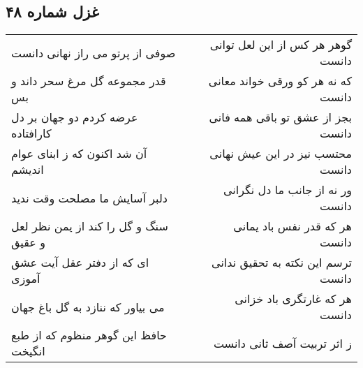 \begin{center}
\section*{غزل شماره ۴۸}
\label{sec:sh048}
\begin{longtable}{l p{0.5cm} r}
صوفی از پرتو می راز نهانی دانست
&&
گوهر هر کس از این لعل توانی دانست
\\
قدر مجموعه گل مرغ سحر داند و بس
&&
که نه هر کو ورقی خواند معانی دانست
\\
عرضه کردم دو جهان بر دل کارافتاده
&&
بجز از عشق تو باقی همه فانی دانست
\\
آن شد اکنون که ز ابنای عوام اندیشم
&&
محتسب نیز در این عیش نهانی دانست
\\
دلبر آسایش ما مصلحت وقت ندید
&&
ور نه از جانب ما دل نگرانی دانست
\\
سنگ و گل را کند از یمن نظر لعل و عقیق
&&
هر که قدر نفس باد یمانی دانست
\\
ای که از دفتر عقل آیت عشق آموزی
&&
ترسم این نکته به تحقیق ندانی دانست
\\
می بیاور که ننازد به گل باغ جهان
&&
هر که غارتگری باد خزانی دانست
\\
حافظ این گوهر منظوم که از طبع انگیخت
&&
ز اثر تربیت آصف ثانی دانست
\\
\end{longtable}
\end{center}
